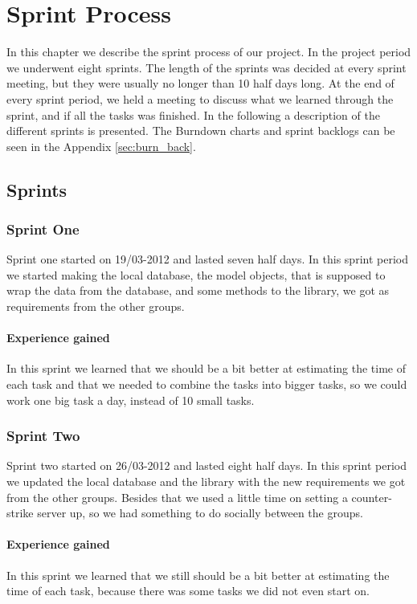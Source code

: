 \chapter{Sprint Process}
\label{ch:SprintProcess}
In this chapter we describe the sprint process of our project. In the project period we underwent eight sprints. The length of the sprints was decided at every sprint meeting, but they were usually no longer than 10 half days long. At the end of every sprint period, we held a meeting to discuss what we learned through the sprint, and if all the tasks was finished. In the following a description of the different sprints is presented. The Burndown charts and sprint backlogs can be seen in the Appendix \vref{sec:burn_back}.

\section{Sprints}
\subsection{Sprint One}
Sprint one started on 19/03-2012 and lasted seven half days. In this sprint period we started making the local database, the model objects, that is supposed to wrap the data from the database, and some methods to the library, we got as requirements from the other groups.

\subsubsection{Experience gained}
In this sprint we learned that we should be a bit better at estimating the time of each task and that we needed to combine the tasks into bigger tasks, so we could work one big task a day, instead of 10 small tasks.

\subsection{Sprint Two}
Sprint two started on 26/03-2012 and lasted eight half days. In this sprint period we updated the local database and the library with the new requirements we got from the other groups. Besides that we used a little time on setting a counter-strike server up, so we had something to do socially between the groups.

\subsubsection{Experience gained}
In this sprint we learned that we still should be a bit better at estimating the time of each task, because there was some tasks we did not even start on.


